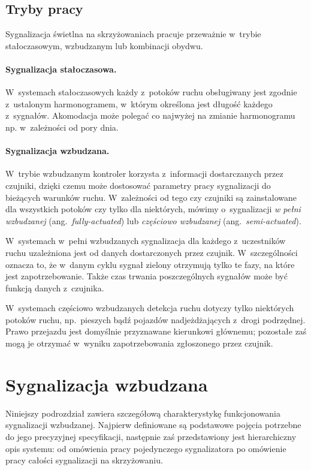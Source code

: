 \documentclass{pracamgr}
\newcommand{\ang}[1]{(ang.~\emph{#1})}
\theoremstyle{plain}
\begin{document}
\subsection{Tryby pracy}
\label{ss:tryby} Sygnalizacja świetlna na skrzyżowaniach pracuje
przeważnie w~trybie stałoczasowym, wzbudzanym lub kombinacji obydwu.

\paragraph{Sygnalizacja stałoczasowa.} W~systemach stałoczasowych każdy
z~potoków ruchu obsługiwany jest zgodnie z~ustalonym harmonogramem,
w~którym określona jest długość każdego z~sygnałów. Akomodacja może
polegać co najwyżej na zmianie harmonogramu np. w~zależności od pory dnia.

\paragraph{Sygnalizacja wzbudzana.}
W~trybie wzbudzanym kontroler korzysta z~informacji dostarczanych
przez czujniki, dzięki czemu może dostosować parametry pracy
sygnalizacji do bieżących warunków ruchu. W~zależności od tego czy
czujniki są zainstalowane dla wszystkich potoków czy tylko dla
niektórych, mówimy o~sygnalizacji \emph{w pełni wzbudzanej}
\ang{fully-actuated} lub \emph{częściowo wzbudzanej}
\ang{semi-actuated}.

W~systemach w~pełni wzbudzanych sygnalizacja dla każdego z~uczestników
ruchu uzależniona jest od danych dostarczonych przez czujnik.
W~szczególności oznacza to, że w~danym cyklu sygnał zielony otrzymują
tylko te fazy, na które jest zapotrzebowanie. Także czas trwania
poszczególnych sygnałów może być funkcją danych z~czujnika.

W~systemach częściowo wzbudzanych detekcja ruchu dotyczy tylko
niektórych potoków ruchu, np.~pieszych bądź pojazdów nadjeżdżających
z~drogi podrzędnej. Prawo przejazdu jest domyślnie przyznawane
kierunkowi głównemu; pozostałe zaś mogą je otrzymać w~wyniku
zapotrzebowania zgłoszonego przez czujnik.

\section{Sygnalizacja wzbudzana}
\label{s:sygn-szczegoly}

Niniejszy podrozdział zawiera szczegółową charakterystykę
funkcjonowania sygnalizacji wzbudzanej. Najpierw definiowane są
podstawowe pojęcia potrzebne do jego precyzyjnej specyfikacji,
następnie zaś przedstawiony jest hierarchiczny opis systemu: od
omówienia pracy pojedynczego sygnalizatora po omówienie pracy całości
sygnalizacji na skrzyżowaniu.
\end{document}
